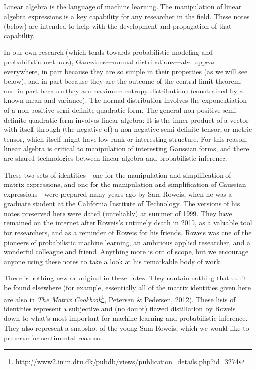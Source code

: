 \documentclass[12pt]{article}
\begin{document}
Linear algebra is the language of machine learning.
The manipulation of linear algebra expressions is a key capability for
any researcher in the field.
These notes (below) are intended to help with the development and
propagation of that capability.

In our own research (which tends towards probabilistic modeling and
probabilistic methods), Gaussians---normal distributions---also appear
everywhere, in part because they are so simple in their properties
(as we will see below), and in part because
they are the outcome of the central limit theorem, and in part
because they are maximum-entropy distributions (constrained by
a known mean and variance).
The normal distribution involves the exponentiation of a
non-positive semi-definite quadratic form.
The general non-positive semi-definite quadratic form involves linear
algebra:
It is the inner product of a vector with itself through (the negative
of) a non-negative semi-definite tensor, or metric tensor, which
itself might have low rank or interesting structure.
For this reason, linear algebra is critical to manipulation of
interesting Gaussian forms, and there are shared technologies between
linear algebra and probabilistic inference.

These two sets of identities---one for the manipulation and
simplification of matrix expressions, and one for the manipulation and
simplification of Gaussian expressions---were prepared many years ago
by Sam Roweis, when he was a graduate
student at the California Institute of Technology.
The versions of his notes preserved here were dated (unreliably) at summer
of 1999.
They have remained on the internet after Roweis's untimely death in 2010,
as a valuable tool for researchers, and as a reminder of Roweis for his
friends.
Roweis was one of the pioneers of probabilistic machine learning, an ambitious
applied researcher, and a wonderful colleague and friend.
Anything more is out of scope, but we encourage anyone using these notes to
take a look at his remarkable body of work.

There is nothing new or original in these notes.
They contain nothing that can't be found elsewhere (for example,
essentially all of the matrix identities given here are also in
\textit{The Matrix Cookbook}\footnote{%
\url{http://www2.imm.dtu.dk/pubdb/views/publication_details.php?id=3274}},
Petersen \& Pedersen, 2012).
These lists of identities represent a subjective and (no doubt) flawed
distillation by Roweis down to what's most important for machine
learning and probabilistic inference.
They also represent a snapshot of the young Sam Roweis, which we would
like to preserve for sentimental reasons.
\end{document}
